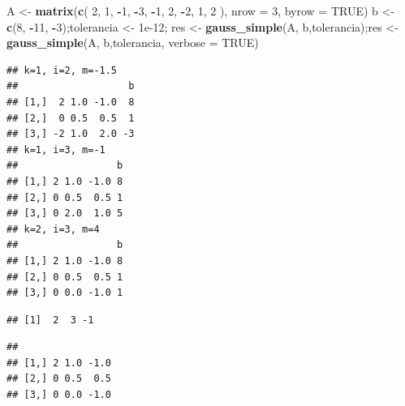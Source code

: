 \documentclass[
]{book}
\newenvironment{Shaded}{\begin{snugshade}}{\end{snugshade}}
\newcommand{\AttributeTok}[1]{\textcolor[rgb]{0.13,0.29,0.53}{#1}}
\newcommand{\ConstantTok}[1]{\textcolor[rgb]{0.56,0.35,0.01}{#1}}
\newcommand{\DecValTok}[1]{\textcolor[rgb]{0.00,0.00,0.81}{#1}}
\newcommand{\FloatTok}[1]{\textcolor[rgb]{0.00,0.00,0.81}{#1}}
\newcommand{\FunctionTok}[1]{\textcolor[rgb]{0.13,0.29,0.53}{\textbf{#1}}}
\newcommand{\NormalTok}[1]{#1}
\newcommand{\OtherTok}[1]{\textcolor[rgb]{0.56,0.35,0.01}{#1}}
\newcommand{\SpecialCharTok}[1]{\textcolor[rgb]{0.81,0.36,0.00}{\textbf{#1}}}
\begin{document}
\begin{Shaded}
\begin{Highlighting}[]
\NormalTok{A }\OtherTok{\textless{}{-}} \FunctionTok{matrix}\NormalTok{(}\FunctionTok{c}\NormalTok{(}
  \DecValTok{2}\NormalTok{,  }\DecValTok{1}\NormalTok{, }\SpecialCharTok{{-}}\DecValTok{1}\NormalTok{,}
 \SpecialCharTok{{-}}\DecValTok{3}\NormalTok{, }\SpecialCharTok{{-}}\DecValTok{1}\NormalTok{,  }\DecValTok{2}\NormalTok{,}
 \SpecialCharTok{{-}}\DecValTok{2}\NormalTok{,  }\DecValTok{1}\NormalTok{,  }\DecValTok{2}
\NormalTok{), }\AttributeTok{nrow =} \DecValTok{3}\NormalTok{, }\AttributeTok{byrow =} \ConstantTok{TRUE}\NormalTok{)}
\NormalTok{b }\OtherTok{\textless{}{-}} \FunctionTok{c}\NormalTok{(}\DecValTok{8}\NormalTok{, }\SpecialCharTok{{-}}\DecValTok{11}\NormalTok{, }\SpecialCharTok{{-}}\DecValTok{3}\NormalTok{);tolerancia }\OtherTok{\textless{}{-}} \FloatTok{1e{-}12}\NormalTok{;}
\NormalTok{res }\OtherTok{\textless{}{-}} \FunctionTok{gauss\_simple}\NormalTok{(A, b,tolerancia);res }\OtherTok{\textless{}{-}} \FunctionTok{gauss\_simple}\NormalTok{(A, b,tolerancia, }\AttributeTok{verbose =} \ConstantTok{TRUE}\NormalTok{)}
\end{Highlighting}
\end{Shaded}

\begin{verbatim}
## k=1, i=2, m=-1.5
##                   b
## [1,]  2 1.0 -1.0  8
## [2,]  0 0.5  0.5  1
## [3,] -2 1.0  2.0 -3
## k=1, i=3, m=-1
##                 b
## [1,] 2 1.0 -1.0 8
## [2,] 0 0.5  0.5 1
## [3,] 0 2.0  1.0 5
## k=2, i=3, m=4
##                 b
## [1,] 2 1.0 -1.0 8
## [2,] 0 0.5  0.5 1
## [3,] 0 0.0 -1.0 1
\end{verbatim}

\begin{Shaded}
\end{Shaded}

\begin{verbatim}
## [1]  2  3 -1
\end{verbatim}

\begin{verbatim}
##                
## [1,] 2 1.0 -1.0
## [2,] 0 0.5  0.5
## [3,] 0 0.0 -1.0
\end{verbatim}
\end{document}
